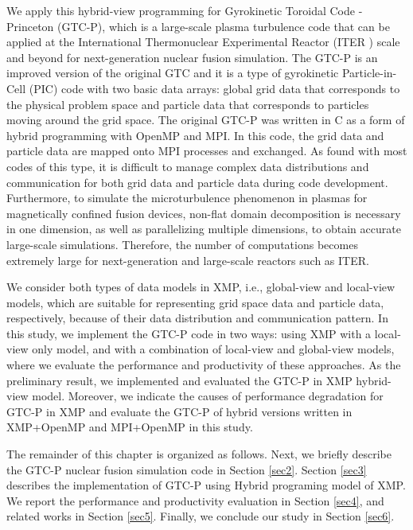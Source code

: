 We apply this hybrid-view programming for Gyrokinetic Toroidal Code - Princeton (GTC-P)\cite{GTC-P1}, which is a large-scale plasma turbulence code that can be applied at the International Thermonuclear Experimental Reactor (ITER \cite{ITER}) scale and beyond for next-generation nuclear fusion simulation.
The GTC-P is an improved version of the original GTC\cite{GTC} and it is a type of gyrokinetic Particle-in-Cell (PIC) code with two basic data arrays: global grid data that corresponds to the physical problem space and particle data that corresponds to particles moving around the grid space. The original GTC-P was written in C as a form of hybrid programming with OpenMP and MPI. In this code, the grid data and particle data are mapped onto MPI processes and exchanged. As found with most codes of this type, it is difficult to manage complex data distributions and communication for both grid data and particle data during code development. Furthermore, to simulate the microturbulence phenomenon in plasmas for magnetically confined fusion devices, non-flat domain decomposition is necessary in one dimension, as well as parallelizing multiple dimensions, to obtain accurate large-scale simulations. Therefore, the number of computations becomes extremely large for next-generation and large-scale reactors such as ITER.

We consider both types of data models in XMP, i.e., global-view and local-view models, which are suitable for representing grid space data and particle data, respectively, because of their data distribution and communication pattern. In this study, we implement the GTC-P code in two ways: using XMP with a local-view only model, and with a combination of local-view and global-view models, where we evaluate the performance and productivity of these approaches. As the preliminary result, we implemented and evaluated the GTC-P in XMP hybrid-view model\cite{HYBRID}. Moreover, we indicate the causes of performance degradation for GTC-P in XMP and evaluate the GTC-P of hybrid versions written in XMP+OpenMP and MPI+OpenMP in this study.

The remainder of this chapter is organized as follows.
Next, we briefly describe the GTC-P nuclear fusion simulation code in Section \ref{sec2}. Section \ref{sec3} describes the implementation of GTC-P using
Hybrid programing model of XMP. We report the performance and productivity evaluation in Section \ref{sec4}, and related works in Section \ref{sec5}. Finally, we conclude our study in Section \ref{sec6}.

